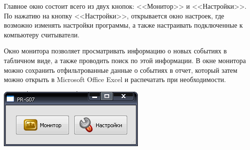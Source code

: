 ﻿Главное окно состоит всего из двух кнопок: <<Монитор>> и <<Настройки>>.
По нажатию на кнопку <<Настройки>>, открывается окно настроек, где возможно изменять настройки программы, 
а также настраивать подключенные к компьютеру считыватели. 

Окно монитора позволяет просматривать информацию
о новых событиях в табличном виде, а также проводить поиск по этой информации. В окне монитора
можно сохранить отфильтрованные данные о событиях в отчет, который затем можно открыть в Microsoft Office 
Excel и распечатать при необходимости.

\begin{center}
    \includegraphics{img/main.png}
\end{center}

